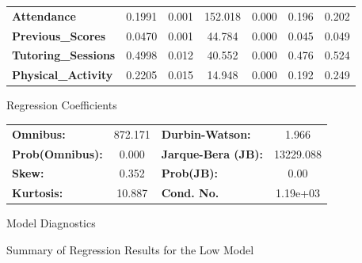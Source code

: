 \documentclass[twocolumn]{article} %
\begin{document}
\begin{figure}[ht]
\begin{subtable}{\textwidth}
\begin{tabular}{lcccccc}
      \textbf{Attendance}                                 &       0.1991  &        0.001     &   152.018  &         0.000        &        0.196    &        0.202     \\
      \textbf{Previous\_Scores}                           &       0.0470  &        0.001     &    44.784  &         0.000        &        0.045    &        0.049     \\
      \textbf{Tutoring\_Sessions}                         &       0.4998  &        0.012     &    40.552  &         0.000        &        0.476    &        0.524     \\
      \textbf{Physical\_Activity}                         &       0.2205  &        0.015     &    14.948  &         0.000        &        0.192    &        0.249     \\
      \bottomrule
    \end{tabular}
    \caption{Regression Coefficients}
    \label{tab:regression_coefficients-low}
  \end{subtable}

  \vspace{1em} %

  \begin{subtable}{\textwidth}
    \centering
    \begin{tabular}{lclc}
      \textbf{Omnibus:}       & 872.171 & \textbf{  Durbin-Watson:     } &     1.966  \\
      \textbf{Prob(Omnibus):} &   0.000 & \textbf{  Jarque-Bera (JB):  } & 13229.088  \\
      \textbf{Skew:}          &   0.352 & \textbf{  Prob(JB):          } &      0.00  \\
      \textbf{Kurtosis:}      &  10.887 & \textbf{  Cond. No.          } &  1.19e+03  \\
      \bottomrule
      \end{tabular}
    \caption{Model Diagnostics}
    \label{tab:model_diagnostics-low}
  \end{subtable}

  \caption{Summary of Regression Results for the Low Model}
  \label{fig:low-model-summary}
\end{figure}
\end{document}

